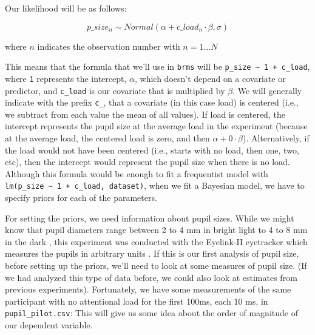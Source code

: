 \documentclass[12pt,]{krantz}
\newenvironment{Shaded}{\begin{snugshade}}{\end{snugshade}}
\newcommand{\KeywordTok}[1]{\textcolor[rgb]{0.13,0.29,0.53}{\textbf{#1}}}
\newcommand{\NormalTok}[1]{#1}
\newcommand{\OperatorTok}[1]{\textcolor[rgb]{0.81,0.36,0.00}{\textbf{#1}}}
\newcommand{\StringTok}[1]{\textcolor[rgb]{0.31,0.60,0.02}{#1}}
\theoremstyle{definition}
\theoremstyle{definition}
\theoremstyle{definition}
\theoremstyle{remark}
\begin{document}
Our likelihood will be as follows:

\begin{equation}
p\_size_n \sim Normal(\alpha + c\_load_n \cdot \beta,\sigma)
\end{equation}

where \(n\) indicates the observation number with \(n = 1 \ldots N\)

This means that the formula that we'll use in \texttt{brms} will be \texttt{p\_size\ \textasciitilde{}\ 1\ +\ c\_load}, where \texttt{1} represents the intercept, \(\alpha\), which doesn't depend on a covariate or predictor, and \texttt{c\_load} is our covariate that is multiplied by \(\beta\). We will generally indicate with the prefix \texttt{c\_}, that a covariate (in this case load) is centered (i.e., we subtract from each value the mean of all values). If load is centered, the intercept represents the pupil size at the average load in the experiment (because at the average load, the centered load is zero, and then \(\alpha + 0 \cdot \beta\)). Alternatively, if the load would not have been centered (i.e., starts with no load, then one, two, etc), then the intercept would represent the pupil size when there is no load. Although this formula would be enough to fit a frequentist model with \texttt{lm(p\_size\ \textasciitilde{}\ 1\ +\ c\_load,\ dataset)}, when we fit a Bayesian model, we have to specify priors for each of the parameters.

For setting the priors, we need information about pupil sizes. While we might know that pupil diameters range between 2 to 4 mm in bright light to 4 to 8 mm in the dark \citep{spectorPupils1990}, this experiment was conducted with the Eyelink-II eyetracker which measures the pupils in arbitrary units \citep{hayesMappingCorrectingInfluence2016}. If this is our first analysis of pupil size, before setting up the priors, we'll need to look at some measures of pupil size. (If we had analyzed this type of data before, we could also look at estimates from previous experiments). Fortunately, we have some measurements of the same participant with no attentional load for the first 100ms, each 10 ms, in \texttt{pupil\_pilot.csv}: This will give us some idea about the order of magnitude of our dependent variable.

\begin{Shaded}
\end{Shaded}
\end{document}
